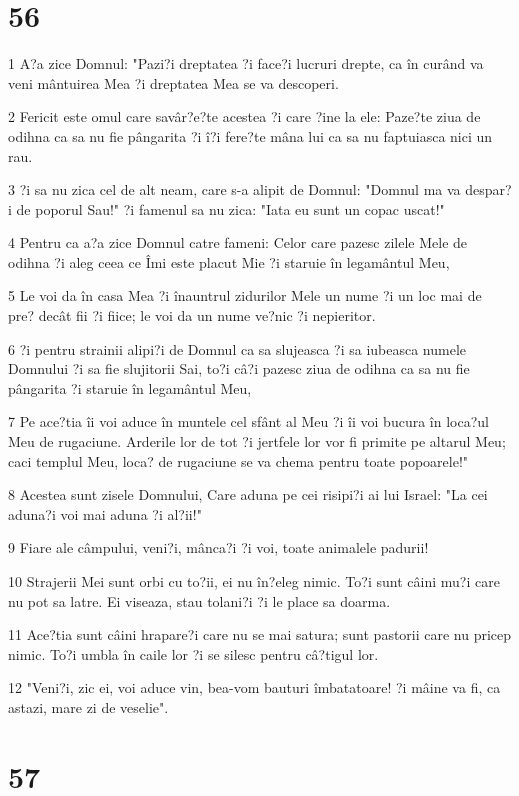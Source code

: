 \chapter{56}

\par 1 A?a zice Domnul: "Pazi?i dreptatea ?i face?i lucruri drepte, ca în curând va veni mântuirea Mea ?i dreptatea Mea se va descoperi.
\par 2 Fericit este omul care savâr?e?te acestea ?i care ?ine la ele: Paze?te ziua de odihna ca sa nu fie pângarita ?i î?i fere?te mâna lui ca sa nu faptuiasca nici un rau.
\par 3 ?i sa nu zica cel de alt neam, care s-a alipit de Domnul: "Domnul ma va despar?i de poporul Sau!" ?i famenul sa nu zica: "Iata eu sunt un copac uscat!"
\par 4 Pentru ca a?a zice Domnul catre fameni: Celor care pazesc zilele Mele de odihna ?i aleg ceea ce Îmi este placut Mie ?i staruie în legamântul Meu,
\par 5 Le voi da în casa Mea ?i înauntrul zidurilor Mele un nume ?i un loc mai de pre? decât fii ?i fiice; le voi da un nume ve?nic ?i nepieritor.
\par 6 ?i pentru strainii alipi?i de Domnul ca sa slujeasca ?i sa iubeasca numele Domnului ?i sa fie slujitorii Sai, to?i câ?i pazesc ziua de odihna ca sa nu fie pângarita ?i staruie în legamântul Meu,
\par 7 Pe ace?tia îi voi aduce în muntele cel sfânt al Meu ?i îi voi bucura în loca?ul Meu de rugaciune. Arderile lor de tot ?i jertfele lor vor fi primite pe altarul Meu; caci templul Meu, loca? de rugaciune se va chema pentru toate popoarele!"
\par 8 Acestea sunt zisele Domnului, Care aduna pe cei risipi?i ai lui Israel: "La cei aduna?i voi mai aduna ?i al?ii!"
\par 9 Fiare ale câmpului, veni?i, mânca?i ?i voi, toate animalele padurii!
\par 10 Strajerii Mei sunt orbi cu to?ii, ei nu în?eleg nimic. To?i sunt câini mu?i care nu pot sa latre. Ei viseaza, stau tolani?i ?i le place sa doarma.
\par 11 Ace?tia sunt câini hrapare?i care nu se mai satura; sunt pastorii care nu pricep nimic. To?i umbla în caile lor ?i se silesc pentru câ?tigul lor.
\par 12 "Veni?i, zic ei, voi aduce vin, bea-vom bauturi îmbatatoare! ?i mâine va fi, ca astazi, mare zi de veselie".

\chapter{57}


